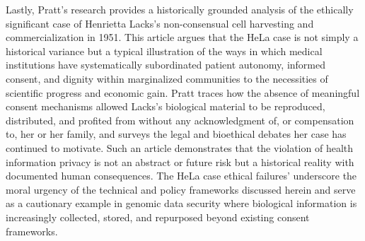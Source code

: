 \documentclass[12pt]{article}
\begin{document}
Lastly, Pratt's research provides a historically grounded analysis of the ethically significant case of Henrietta Lacks's non-consensual cell harvesting and commercialization in 1951. This article argues that the HeLa case is not simply a historical variance but a typical illustration of the ways in which medical institutions have systematically subordinated patient autonomy, informed consent, and dignity within marginalized communities to the necessities of scientific progress and economic gain. Pratt traces how the absence of meaningful consent mechanisms allowed Lacks's biological material to be reproduced, distributed, and profited from without any acknowledgment of, or compensation to, her or her family, and surveys the legal and bioethical debates her case has continued to motivate. Such an article demonstrates that the violation of health information privacy is not an abstract or future risk but a historical reality with documented human consequences. The HeLa case ethical failures’ underscore the moral urgency of the technical and policy frameworks discussed herein and serve as a cautionary example in genomic data security where biological information is increasingly collected, stored, and repurposed beyond existing consent frameworks.

\end{document}
